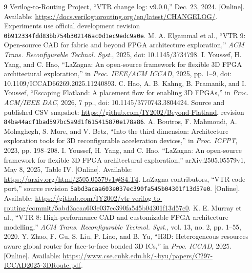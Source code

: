\documentclass[conference,10pt]{IEEEtran}
\begin{document}
\clearpage
\begin{thebibliography}{9}
 Verilog-to-Routing Project, ``VTR change log: v9.0.0,'' Dec. 23, 2024. [Online]. Available: \url{https://docs.verilogtorouting.org/en/latest/CHANGELOG/}. Experiments use official development revision \texttt{0b912334fdd83bb754b302146ac0d1ec9edc9a0e}.
 M. A. Elgammal et al., ``VTR 9: Open-source CAD for fabric and beyond FPGA architecture exploration,'' \emph{ACM Trans. Reconfigurable Technol. Syst.}, 2025, doi: 10.1145/3734798.
 I. Youssef, H. Yang, and C. Hao, ``LaZagna: An open-source framework for flexible 3D FPGA architectural exploration,'' in \emph{Proc. IEEE/ACM ICCAD}, 2025, pp. 1--9, doi: 10.1109/ICCAD66269.2025.11240893.
 C. Hao, A. B. Kahng, B. Pramanik, and I. Youssef, ``Escaping Flatland: A placement flow for enabling 3D FPGAs,'' in \emph{Proc. ACM/IEEE DAC}, 2026, 7 pp., doi: 10.1145/3770743.3804424. Source and published CSV snapshot: \url{https://github.com/IY2002/Beyond-Flatland}, revision \texttt{84ba44acf1bad597bc5a9d1f615415870e178a86}.
 A. Boutros, F. Mahmoudi, A. Mohaghegh, S. More, and V. Betz, ``Into the third dimension: Architecture exploration tools for 3D reconfigurable acceleration devices,'' in \emph{Proc. ICFPT}, 2023, pp. 198--208.
 I. Youssef, H. Yang, and C. Hao, ``LaZagna: An open-source framework for flexible 3D FPGA architectural exploration,'' arXiv:2505.05579v1, May 8, 2025, Table IV. [Online]. Available: \url{https://arxiv.org/html/2505.05579v1#S4.T4}.
 LaZagna contributors, ``VTR code port,'' source revision \texttt{5abd3acaa603e037ec390fa545b04301f13d57e0}. [Online]. Available: \url{https://github.com/IY2002/vtr-verilog-to-routing/commit/5abd3acaa603e037ec390fa545b04301f13d57e0}.
 K. E. Murray et al., ``VTR 8: High-performance CAD and customizable FPGA architecture modelling,'' \emph{ACM Trans. Reconfigurable Technol. Syst.}, vol. 13, no. 2, pp. 1--55, 2020.
 Y. Zhao, F. Gu, S. Liu, P. Liao, and B. Yu, ``H3D: Heterogeneous resources aware global router for face-to-face bonded 3D ICs,'' in \emph{Proc. ICCAD}, 2025. [Online]. Available: \url{https://www.cse.cuhk.edu.hk/~byu/papers/C297-ICCAD2025-3DRoute.pdf}.
\end{thebibliography}
\end{document}

